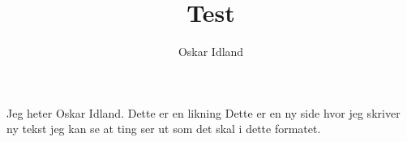 \documentclass{article}
\author{Oskar Idland}
\title{Test}
\date{}
\begin{document}
\maketitle

Jeg heter Oskar Idland. Dette er en likning 
\newpage
Dette er en ny side hvor jeg skriver ny tekst jeg kan se at ting ser ut som det skal i dette formatet. 
\end{document}

